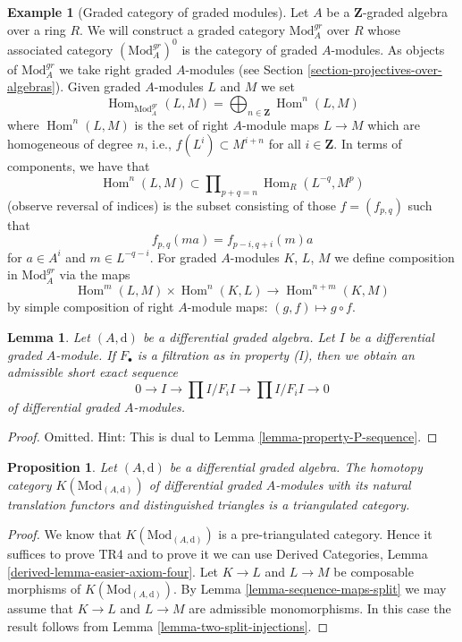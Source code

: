 \documentclass{stacks-project}
\theoremstyle{plain}
\newtheorem{proposition}[subsection]{Proposition}
\newtheorem{lemma}[subsection]{Lemma}
\theoremstyle{definition}
\newtheorem{example}[subsection]{Example}
\theoremstyle{remark}
\numberwithin{equation}{subsection}
\def\Hom{\mathop{\mathrm{Hom}}\nolimits}
\begin{document}
\begin{example}[Graded category of graded modules]
\label{example-gm-gr-cat}
Let $A$ be a $\mathbf{Z}$-graded algebra over a ring $R$. We will construct
a graded category $\text{Mod}^{gr}_A$ over $R$ whose associated category
$(\text{Mod}^{gr}_A)^0$ is the category of graded $A$-modules. As objects
of $\text{Mod}^{gr}_A$ we take right graded $A$-modules (see
Section \ref{section-projectives-over-algebras}). Given graded
$A$-modules $L$ and $M$ we set
$$
\Hom_{\text{Mod}^{gr}_A}(L, M) =
\bigoplus\nolimits_{n \in \mathbf{Z}} \Hom^n(L, M)
$$
where $\Hom^n(L, M)$ is the set of right $A$-module maps $L \to M$ which
are homogeneous of degree $n$, i.e., $f(L^i) \subset M^{i + n}$ for
all $i \in \mathbf{Z}$. In terms of components, we have that
$$
\Hom^n(L, M) \subset \prod\nolimits_{p + q = n} \Hom_R(L^{-q}, M^p)
$$
(observe reversal of indices) is the subset consisting of those
$f = (f_{p, q})$ such that
$$
f_{p, q}(m a) = f_{p - i, q + i}(m)a
$$
for $a \in A^i$ and $m \in L^{-q - i}$. For graded $A$-modules
$K$, $L$, $M$ we define composition in $\text{Mod}^{gr}_A$ via
the maps
$$
\Hom^m(L, M) \times \Hom^n(K, L) \longrightarrow \Hom^{n + m}(K, M)
$$
by simple composition of right $A$-module maps: $(g, f) \mapsto g \circ f$.
\end{example}

\begin{lemma}
\label{lemma-property-I-sequence}
Let $(A, \text{d})$ be a differential graded algebra.
Let $I$ be a differential graded $A$-module. If $F_\bullet$
is a filtration as in property (I), then we obtain an
admissible short exact sequence
$$
0 \to I \to
\prod\nolimits I/F_iI \to
\prod\nolimits I/F_iI \to 0
$$
of differential graded $A$-modules.
\end{lemma}

\begin{proof}
Omitted. Hint: This is dual to Lemma \ref{lemma-property-P-sequence}.
\end{proof}

\begin{proposition}
\label{proposition-homotopy-category-triangulated}
Let $(A, \text{d})$ be a differential graded algebra. The homotopy category
$K(\text{Mod}_{(A, \text{d})})$ of differential graded $A$-modules with its
natural translation functors and distinguished triangles is a triangulated
category.
\end{proposition}

\begin{proof}
We know that $K(\text{Mod}_{(A, \text{d})})$ is a pre-triangulated category.
Hence it suffices to prove TR4 and to prove it we can use
Derived Categories, Lemma \ref{derived-lemma-easier-axiom-four}.
Let $K \to L$ and $L \to M$ be composable morphisms of
$K(\text{Mod}_{(A, \text{d})})$. By
Lemma \ref{lemma-sequence-maps-split} we may assume that
$K \to L$ and $L \to M$ are admissible monomorphisms.
In this case the result follows from
Lemma \ref{lemma-two-split-injections}.
\end{proof}
\end{document}
